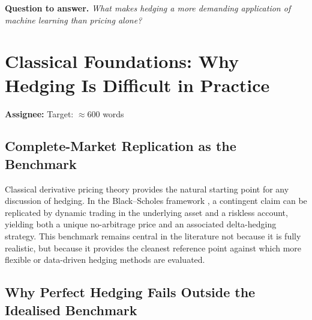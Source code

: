 \documentclass[12pt, a4paper]{article}
\newcommand{\litquestion}[1]{\noindent\textbf{Question to answer.} \emph{#1}}
\begin{document}
\litquestion{What makes hedging a more demanding application of machine learning than
pricing alone?}

\section{Classical Foundations: Why Hedging Is Difficult in Practice}
\label{sec:foundations}

\begin{assignbox}
\textbf{Assignee:} \underline{\hspace{4cm}} \quad Target: $\approx 600$ words
\end{assignbox}


\subsection{Complete-Market Replication as the Benchmark}
\label{subsec:bsm}

Classical derivative pricing theory provides the natural starting point for any
discussion of hedging. In the Black--Scholes framework \citep{BlackScholes1973,
Merton1973}, a contingent claim can be replicated by dynamic trading in the underlying
asset and a riskless account, yielding both a unique no-arbitrage price and an
associated delta-hedging strategy. This benchmark remains central in the literature
not because it is fully realistic, but because it provides the cleanest reference
point against which more flexible or data-driven hedging methods are evaluated.


\subsection{Why Perfect Hedging Fails Outside the Idealised Benchmark}
\label{subsec:imperfect}
\end{document}

